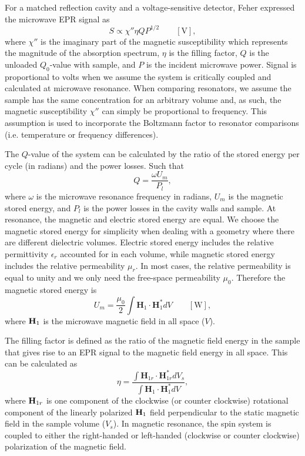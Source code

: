 For a matched reflection cavity and a voltage-sensitive detector, Feher expressed the microwave EPR signal as
\begin{equation}
    S \propto \chi'' \eta Q P^{1/2} \qquad [\text{V}],\label{ch2-fehereq}
\end{equation}
where $\chi''$ is the imaginary part of the magnetic susceptibility which represents the magnitude of the absorption spectrum, $\eta$ is the filling factor, $Q$ is the unloaded $Q_0$-value with sample, and $P$ is the incident microwave power.  \cite{FeherSignal} Signal is proportional to volts when we assume the system is critically coupled and calculated at microwave resonance. When comparing resonators, we assume the sample has the same concentration for an arbitrary volume and, as such, the magnetic susceptibility $\chi''$ can simply be proportional to frequency. This assumption is used to incorporate the Boltzmann factor to resonator comparisons (i.e. temperature or frequency differences).

The $Q$-value of the system can be calculated by the ratio of the stored energy per cycle (in radians) and the power losses. Such that
\begin{equation}
    Q = \frac{\omega U_m}{P_l},\label{ch2-Qval}
\end{equation}
where $\omega$ is the microwave resonance frequency in radians, $U_m$ is the magnetic stored energy, and $P_l$ is the power losses in the cavity walls and sample. At resonance, the magnetic and electric stored energy are equal. \cite{ramo1984fields} We choose the magnetic stored energy for simplicity when dealing with a geometry where there are different dielectric volumes. Electric stored energy includes the relative permittivity $\epsilon_r$ accounted for in each volume, while magnetic stored energy includes the relative permeability $\mu_r$. In most cases, the relative permeability is equal to unity and we only need the free-space permeability $\mu_0$. Therefore the magnetic stored energy is
\begin{equation}
    U_m = \frac{\mu_0}{2} \int \mathbf{H}_1\cdot\mathbf{H}_1^* dV \qquad [\text{W}],
\end{equation}
where ${\textbf H}_1$ is the microwave magnetic field in all space ($V$).

The filling factor is defined as the ratio of the magnetic field energy in the sample that gives rise to an EPR signal to the magnetic field energy in all space. This can be calculated as
\begin{equation}
 \eta = \frac{\int {\mathbf H}_{1r} \cdot {\mathbf H}_{1r}^* dV_s}{\int {\mathbf H}_1 \cdot {\mathbf H}_1^* dV}, \label{eq-2:filling}
\end{equation}
where ${\textbf H}_{1r}$ is one component of the clockwise (or counter clockwise) rotational component of the linearly polarized ${\textbf H}_1$ field perpendicular to the static magnetic field in the sample volume ($V_s$). \cite{jackson1975classical} In magnetic resonance, the spin system is coupled to either the right-handed or left-handed (clockwise or counter clockwise) polarization of the magnetic field. 

